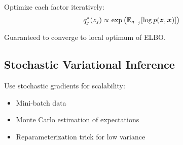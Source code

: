 Optimize each factor iteratively:
\begin{equation}
q_j^*(z_j) \propto \exp\left(\mathbb{E}_{q_{-j}}[\log p(\boldsymbol{z}, \boldsymbol{x})]\right)
\end{equation}

Guaranteed to converge to local optimum of ELBO.

\subsection{Stochastic Variational Inference}

Use stochastic gradients for scalability:
\begin{itemize}
    \item Mini-batch data
    \item Monte Carlo estimation of expectations
    \item Reparameterization trick for low variance
\end{itemize}

